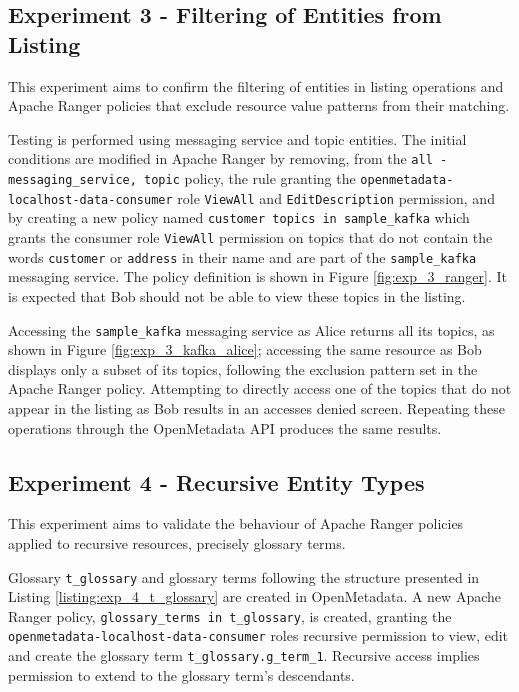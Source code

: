 \subsection{Experiment 3 - Filtering of Entities from Listing}

This experiment aims to confirm the filtering of entities in listing operations and Apache Ranger policies that exclude resource value patterns from their matching.

Testing is performed using messaging service and topic entities. The initial conditions are modified in Apache Ranger by removing, from the \texttt{all - messaging_service, topic} policy, the rule granting the \texttt{openmetadata-localhost-data-consumer} role \texttt{ViewAll} and \texttt{EditDescription} permission, and by creating a new policy named \texttt{customer topics in sample_kafka} which grants the consumer role \texttt{ViewAll} permission on topics that do not contain the words \texttt{customer} or \texttt{address} in their name and are part of the \texttt{sample_kafka} messaging service. The policy definition is shown in Figure \ref{fig:exp_3_ranger}. It is expected that Bob should not be able to view these topics in the listing.

Accessing the \texttt{sample_kafka} messaging service as Alice returns all its topics, as shown in Figure \ref{fig:exp_3_kafka_alice}; accessing the same resource as Bob displays only a subset of its topics, following the exclusion pattern set in the Apache Ranger policy. Attempting to directly access one of the topics that do not appear in the listing as Bob results in an accesses denied screen. Repeating these operations through the OpenMetadata API produces the same results.

\subsection{Experiment 4 - Recursive Entity Types}

This experiment aims to validate the behaviour of Apache Ranger policies applied to recursive resources, precisely glossary terms.

Glossary \texttt{t_glossary} and glossary terms following the structure presented in Listing \ref{listing:exp_4_t_glossary} are created in OpenMetadata. A new Apache Ranger policy, \texttt{glossary_terms in t_glossary}, is created, granting the \texttt{openmetadata-localhost-data-consumer} roles recursive permission to view, edit and create the glossary term \texttt{t_glossary.g_term_1}. Recursive access implies permission to extend to the glossary term's descendants.

